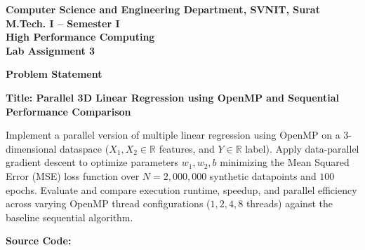 \documentclass[12pt]{article}
\begin{document}

\begin{center}
\textbf{Computer Science and Engineering Department, SVNIT, Surat}\\
\textbf{M.Tech. I -- Semester I}\\
\textbf{High Performance Computing}\\
\textbf{Lab Assignment 3}
\end{center}

\vspace{0.4cm}

\textbf{Problem Statement}

\textbf{Title: Parallel 3D Linear Regression using OpenMP and Sequential Performance Comparison}

Implement a parallel version of multiple linear regression using OpenMP on a 3-dimensional dataspace ($X_1, X_2 \in \mathbb{R}$ features, and $Y \in \mathbb{R}$ label). Apply data-parallel gradient descent to optimize parameters $w_1, w_2, b$ minimizing the Mean Squared Error (MSE) loss function over $N = 2,000,000$ synthetic datapoints and $100$ epochs. Evaluate and compare execution runtime, speedup, and parallel efficiency across varying OpenMP thread configurations ($1, 2, 4, 8$ threads) against the baseline sequential algorithm.

\vspace{0.3cm}

\textbf{Source Code:}
\end{document}
